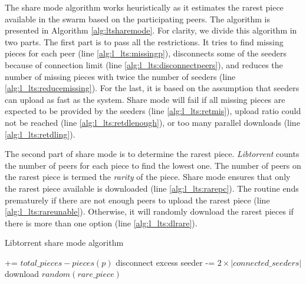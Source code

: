 The share mode algorithm works heuristically as it estimates the rarest piece available in the swarm based on the participating peers. The algorithm is presented in Algorithm \ref{alg:ltsharemode}. For clarity, we divide this algorithm in two parts. The first part is to pass all the restrictions. It tries to find missing pieces for each peer (line \ref{alg:l_lts:missingp}), disconnects some of the seeders because of connection limit (line \ref{alg:l_lts:disconnectpeers}), and reduces the number of missing pieces with twice the number of seeders (line \ref{alg:l_lts:reducemissing}). For the last, it is based on the assumption that seeders can upload as fast as the system. Share mode will fail if all missing pieces are expected to be provided by the seeders (line \ref{alg:l_lts:retmis}), upload ratio could not be reached (line \ref{alg:l_lts:retdlenough}), or too many parallel downloads (line \ref{alg:l_lts:retdling}).

The second part of share mode is to determine the rarest piece. \textit{Libtorrent} counts the number of peers for each piece to find the lowest one. The number of peers on the rarest piece is termed the \textit{rarity} of the piece. Share mode ensures that only the rarest piece available is downloaded (line \ref{alg:l_lts:rarepc}). The routine ends prematurely if there are not enough peers to upload the rarest piece (line \ref{alg:l_lts:rareunable}). Otherwise, it will randomly download the rarest pieces if there is more than one option (line \ref{alg:l_lts:dlrare}). 

\begin{algorithm}[h!]
	\caption{Libtorrent share mode algorithm}
	\label{alg:ltsharemode}
	\begin{algorithmic}[1]
		\Statex \hrulefill {}
		 += {$total\_pieces - pieces(p)$} \label{alg:l_lts:missingp}
		\EndIf	
		\EndFor
		\State disconnect excess seeder \label{alg:l_lts:disconnectpeers}
		\EndIf
		 -= {$2 \times |connected\_seeders|$}	\label{alg:l_lts:reducemissing}	
		  \label{alg:l_lts:retmis}
		\State \Return 
		\EndIf
		 \label{alg:l_lts:retdlenough}
		\State \Return
		\EndIf
		 \label{alg:l_lts:retdling}
		\State \Return
		\EndIf
		\Statex \hrulefill {}
			\label{alg:l_lts:rarepc}
		\EndIf	
		\EndFor
		 \label{alg:l_lts:rareunable}
		\State \Return
		\EndIf
		\State download {$random(rare\_piece)$} \label{alg:l_lts:dlrare}
	\end{algorithmic}
\end{algorithm}


